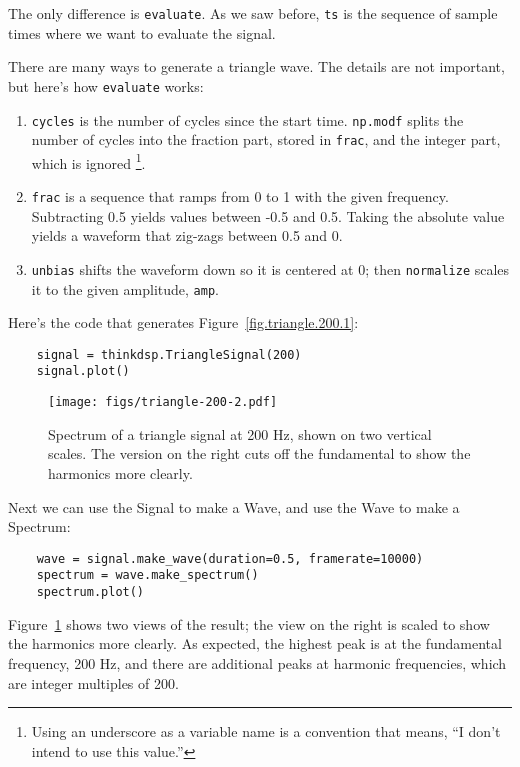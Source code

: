 The only difference is {\tt evaluate}.  As we saw before,
{\tt ts} is the sequence of sample times where we want to
evaluate the signal.

There are many ways to generate a triangle wave.  The details
are not important, but here's how {\tt evaluate} works:

\begin{enumerate}
	
	\item {\tt cycles} is the number of cycles since the start time.
	{\tt np.modf} splits the number of cycles into the fraction
	part, stored in {\tt frac}, and the integer part, which is ignored
	\footnote{Using an underscore as a variable name is a convention that
		means, ``I don't intend to use this value.''}.
	
	\item {\tt frac} is a sequence that ramps from 0 to 1 with the given
	frequency.  Subtracting 0.5 yields values between -0.5 and 0.5.
	Taking the absolute value yields a waveform that zig-zags between
	0.5 and 0.
	
	\item {\tt unbias} shifts the waveform down so it is centered at 0; then
	{\tt normalize} scales it to the given amplitude, {\tt amp}.
	
\end{enumerate}

Here's the code that generates Figure~\ref{fig.triangle.200.1}:

\begin{verbatim}
	signal = thinkdsp.TriangleSignal(200)
	signal.plot()
\end{verbatim}

\begin{figure}
	\centerline{\texttt{[image: figs/triangle-200-2.pdf]}}
	\caption{Spectrum of a triangle signal at 200 Hz, shown on two
		vertical scales.  The version on the right cuts off the fundamental
		to show the harmonics more clearly.}
	\label{fig.triangle.200.2}
\end{figure}

Next we can use the Signal to make a Wave, and use the Wave to
make a Spectrum:

\begin{verbatim}
	wave = signal.make_wave(duration=0.5, framerate=10000)
	spectrum = wave.make_spectrum()
	spectrum.plot()
\end{verbatim}

Figure~\ref{fig.triangle.200.2} shows two views of the result; the
view on the right is scaled to show the harmonics more clearly.  As
expected, the highest peak is at the fundamental frequency, 200 Hz,
and there are additional peaks at harmonic frequencies, which are
integer multiples of 200.

